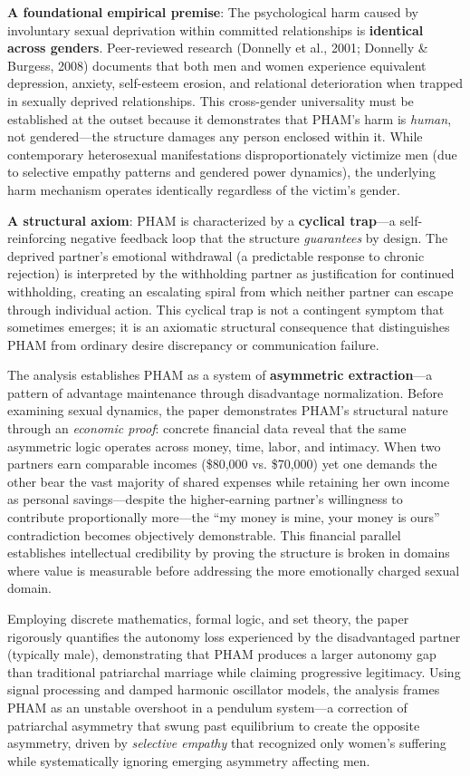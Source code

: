 \documentclass[12pt,openany]{book}
\numberwithin{equation}{chapter}
\begin{document}
\textbf{A foundational empirical premise}: The psychological harm caused by involuntary sexual deprivation within committed relationships is \textbf{identical across genders}. Peer-reviewed research (Donnelly et al., 2001; Donnelly \& Burgess, 2008) documents that both men and women experience equivalent depression, anxiety, self-esteem erosion, and relational deterioration when trapped in sexually deprived relationships. This cross-gender universality must be established at the outset because it demonstrates that PHAM's harm is \textit{human}, not gendered---the structure damages any person enclosed within it. While contemporary heterosexual manifestations disproportionately victimize men (due to selective empathy patterns and gendered power dynamics), the underlying harm mechanism operates identically regardless of the victim's gender.

\textbf{A structural axiom}: PHAM is characterized by a \textbf{cyclical trap}---a self-reinforcing negative feedback loop that the structure \textit{guarantees} by design. The deprived partner's emotional withdrawal (a predictable response to chronic rejection) is interpreted by the withholding partner as justification for continued withholding, creating an escalating spiral from which neither partner can escape through individual action. This cyclical trap is not a contingent symptom that sometimes emerges; it is an axiomatic structural consequence that distinguishes PHAM from ordinary desire discrepancy or communication failure.

The analysis establishes PHAM as a system of \textbf{asymmetric extraction}---a pattern of advantage maintenance through disadvantage normalization. Before examining sexual dynamics, the paper demonstrates PHAM's structural nature through an \textit{economic proof}: concrete financial data reveal that the same asymmetric logic operates across money, time, labor, and intimacy. When two partners earn comparable incomes (\$80,000 vs. \$70,000) yet one demands the other bear the vast majority of shared expenses while retaining her own income as personal savings---despite the higher-earning partner's willingness to contribute proportionally more---the ``my money is mine, your money is ours'' contradiction becomes objectively demonstrable. This financial parallel establishes intellectual credibility by proving the structure is broken in domains where value is measurable before addressing the more emotionally charged sexual domain.

Employing discrete mathematics, formal logic, and set theory, the paper rigorously quantifies the autonomy loss experienced by the disadvantaged partner (typically male), demonstrating that PHAM produces a larger autonomy gap than traditional patriarchal marriage while claiming progressive legitimacy. Using signal processing and damped harmonic oscillator models, the analysis frames PHAM as an unstable overshoot in a pendulum system---a correction of patriarchal asymmetry that swung past equilibrium to create the opposite asymmetry, driven by \textit{selective empathy} that recognized only women's suffering while systematically ignoring emerging asymmetry affecting men.
\end{document}
